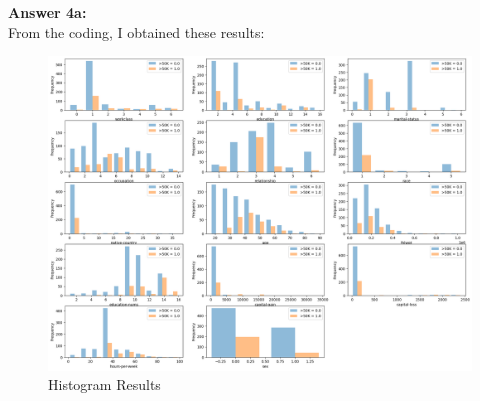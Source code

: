 \documentclass[10pt]{article}
\begin{document}
\begin{flushleft}

\textbf{Answer 4a:}\\

From the coding, I obtained these results:\\

\begin{figure}[H]
\centering
\includegraphics[width=1\textwidth]{histogram.png}
\caption{Histogram Results}
\label{fig:Histogram}
\end{figure}

\hspace{1 cm}


\end{flushleft}
\end{document}
